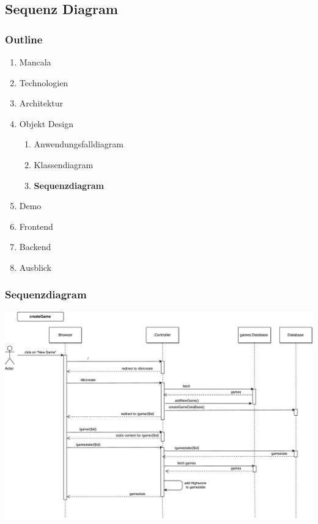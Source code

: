 \documentclass[
	10pt,
	t		%
]{beamer}
\begin{document}
\subsection{Sequenz Diagram}
\begin{frame}
\frametitle{Outline}
\begin{enumerate}
\item Mancala
\item Technologien
\item Architektur
\item Objekt Design
\begin{enumerate}
\item Anwendungsfalldiagram
\item Klassendiagram
\item \textbf{Sequenzdiagram}
\end{enumerate}
\item Demo
\item Frontend
\item Backend
\item Ausblick
\end{enumerate}
\end{frame}

\begin{frame}
\frametitle{Sequenzdiagram}
\begin{center}
\includegraphics[scale=0.32]{./../Diagrams/Sequence_createGame.pdf}
\end{center}
\end{frame}
\end{document}
